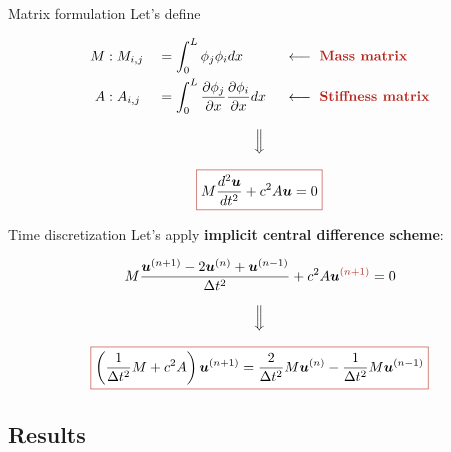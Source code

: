 \begin{frame}{Matrix formulation}
    Let's define

    \begin{alignat*}{3}
        M&:M_{i,j}&&=\int_0^L\phi_j\phi_idx \ &&\longleftarrow \ \text{\textbf{\textcolor{BrickRed}{Mass matrix}}}\\
        A&:A_{i,j}&&=\int_0^L\frac{\partial\phi_j}{\partial x}\frac{\partial\phi_i}{\partial x}dx \ &&\longleftarrow \ \text{\textbf{\textcolor{BrickRed}{Stiffness matrix}}}
    \end{alignat*}

    \pause

    \begin{equation*}
        \Big\Downarrow
    \end{equation*}

    \begin{equation*}
        \fcolorbox{BrickRed}{white}{\text{$\displaystyle M\frac{d^2\boldsymbol{u}}{dt^2}+c^2A\boldsymbol{u}=0$}}
    \end{equation*}
\end{frame}

\begin{frame}{Time discretization}
    Let's apply \textbf{\textcolor{BrickRed}{implicit} central difference scheme}:

    \begin{equation*}
        M\frac{\boldsymbol{u}^{(n+1)}-2\boldsymbol{u}^{(n)}+\boldsymbol{u}^{(n-1)}}{\Delta t^2}+c^2A\boldsymbol{u}^{\textcolor{BrickRed}{(n+1)}}=0
    \end{equation*}

    \pause

    \begin{equation*}
        \Big\Downarrow
    \end{equation*}

    \begin{equation*}
        \fcolorbox{BrickRed}{white}{\text{$\displaystyle\left(\frac{1}{\Delta t^2}M+c^2A\right)\boldsymbol{u}^{(n+1)}=\frac{2}{\Delta t^2}M\boldsymbol{u}^{(n)}-\frac{1}{\Delta t^2}M\boldsymbol{u}^{(n-1)}$}}
    \end{equation*}
\end{frame}

\subsection{Results}

